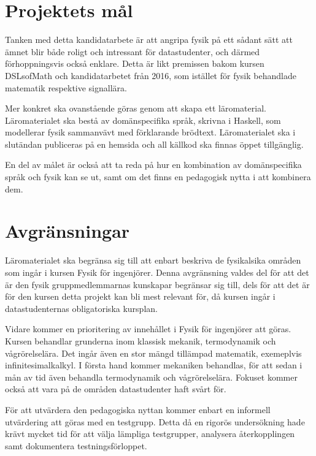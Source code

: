 % 

\section{Projektets mål}

\begin{draft}

Tanken med detta kandidatarbete är att angripa fysik på ett sådant sätt att ämnet blir både roligt och intressant för datastudenter, och därmed förhoppningsvis också enklare. Detta är likt premissen bakom kursen DSLsofMath och kandidatarbetet från 2016, som istället för fysik behandlade matematik respektive signallära.

Mer konkret ska ovanstående göras genom att skapa ett läromaterial. Läromaterialet ska bestå av domänspecifika språk, skrivna i Haskell, som modellerar fysik sammanvävt med förklarande brödtext. Läromaterialet ska i slutändan publiceras på en hemsida och all källkod ska finnas öppet tillgänglig.

En del av målet är också att ta reda på hur en kombination av domänspecifika språk och fysik kan se ut, samt om det finns en pedagogisk nytta i att kombinera dem.

\end{draft}

\section{Avgränsningar}

\begin{draft}

Läromaterialet ska begränsa sig till att enbart beskriva de fysikalsika områden som ingår i kursen Fysik för ingenjörer. Denna avgränsning valdes del för att det är den fysik gruppmedlemmarnas kunskapar begränsar sig till, dels för att det är för den kursen detta projekt kan bli mest relevant för, då kursen ingår i datastudenternas obligatoriska kursplan.

Vidare kommer en prioritering av innehållet i Fysik för ingenjörer att göras. Kursen behandlar grunderna inom klassisk mekanik, termodynamik och vågrörelselära. Det ingår även en stor mängd tillämpad matematik, exemeplvis infinitesimalkalkyl. I första hand kommer mekaniken behandlas, för att sedan i mån av tid även behandla termodynamik och vågrörelselära. Fokuset kommer också att vara på de områden datastudenter haft svårt för.

För att utvärdera den pedagogiska nyttan kommer enbart en informell utvärdering att göras med en testgrupp. Detta då en rigorös undersökning hade krävt mycket tid för att välja lämpliga testgrupper, analysera återkopplingen samt dokumentera testningsförloppet.

\end{draft}
